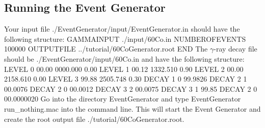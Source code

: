 \documentclass[12pt]{book}
\begin{document}
{\subsection{Running the Event Generator}
Your input file {\ttfamily ./EventGenerator/input/EventGenerator.in} should have the following structure:\hfill{}
\linebreak
\linebreak
{\ttfamily %
  GAMMAINPUT ./input/60Co.in\linebreak
  NUMBEROFEVENTS 100000\linebreak
  OUTPUTFILE ../tutorial/60CoGenerator.root\linebreak
  END
}
\linebreak
\linebreak
The $\gamma$-ray decay file should be {\ttfamily ./EventGenerator/input/60Co.in} and have the following structure:\hfil{}
\linebreak
\linebreak
{\ttfamily
  LEVEL  0  00.00 0000.000 0.00\linebreak
  LEVEL  1  00.12 1332.510 0.90\linebreak
  LEVEL  2  00.00 2158.610 0.00\linebreak
  LEVEL  3  99.88 2505.748 0.30\linebreak
  DECAY  1  0 99.9826\linebreak
  DECAY  2  1 00.0076\linebreak
  DECAY  2  0 00.0012\linebreak
  DECAY  3  2 00.0075\linebreak
  DECAY  3  1 99.85\linebreak
  DECAY  2  0 00.0000020\linebreak
}
\linebreak
Go into the directory {\ttfamily EventGenerator} and type\hfill{}
\linebreak
\linebreak
{\ttfamily
  EventGenerator run\_nothing.mac
}
\linebreak
\linebreak
into the command line.
This will start the Event Generator and create the root output file {\ttfamily ./tutorial/60CoGenerator.root}.

}
\end{document}
